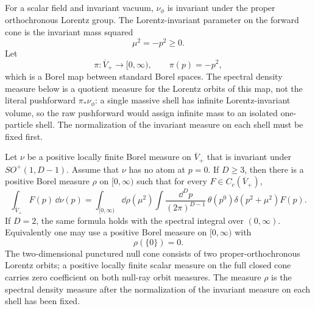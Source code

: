For a scalar field and invariant vacuum, \(\nu_\phi\) is invariant under the
proper orthochronous Lorentz group. The Lorentz-invariant parameter on the
forward cone is the invariant mass squared
\[
  \mu^2=-p^2\ge0.
\]
Let
\[
  \pi:\overline V_+\to[0,\infty),
  \qquad
  \pi(p)=-p^2,
\]
which is a Borel map between standard Borel spaces.  The spectral density
measure below is a quotient measure for the Lorentz orbits of this map, not the
literal pushforward \(\pi_*\nu_\phi\): a single massive shell has infinite
Lorentz-invariant volume, so the raw pushforward would assign infinite mass to
an isolated one-particle shell.  The normalization of the invariant measure on
each shell must be fixed first.

\begin{proposition}
\label{prop:kallen-lehmann-mass-shell-disintegration}
Let \(\nu\) be a positive locally finite Borel measure on
\(\overline V_+\) that is invariant under \(SO^+(1,D-1)\).  Assume that
\(\nu\) has no atom at \(p=0\).  If \(D\ge3\), then there is a positive Borel
measure \(\rho\) on \([0,\infty)\) such that for every
\(F\in C_c(\overline V_+)\),
\[
  \int_{\overline V_+}F(p)\,\dd\nu(p)
  =
  \int_{[0,\infty)}\dd\rho(\mu^2)
  \int\frac{\dd^Dp}{(2\pi)^{D-1}}\,
  \theta(p^0)\delta(p^2+\mu^2)F(p).
\]
If \(D=2\), the same formula holds with the spectral integral over
\((0,\infty)\).  Equivalently one may use a positive Borel measure on
\([0,\infty)\) with
\[
  \rho(\{0\})=0 .
\]
The two-dimensional punctured null cone consists of two proper-orthochronous
Lorentz orbits; a positive locally finite scalar measure on the full closed
cone carries zero coefficient on both null-ray orbit measures.  The measure
\(\rho\) is the spectral density measure after the normalization of the
invariant measure on each shell has been fixed.
\end{proposition}

